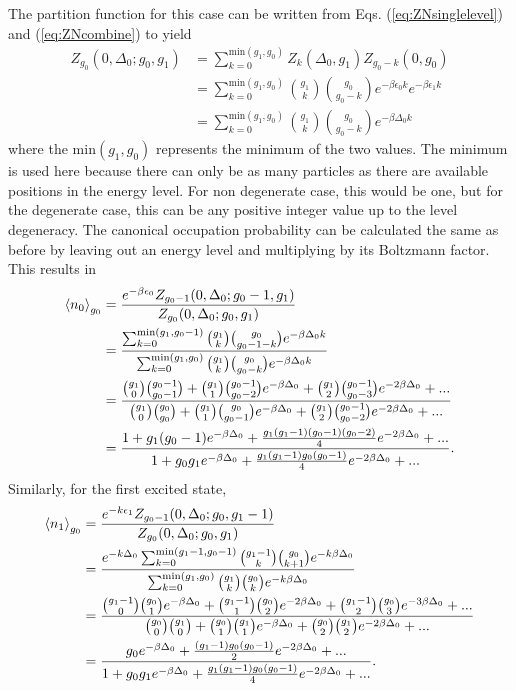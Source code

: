 The partition function for this case can be written from Eqs. (\ref{eq:ZNsinglelevel}) and (\ref{eq:ZNcombine}) to yield
\begin{align}
    Z_{g_0}(0,\Delta_0;g_0,g_1)&=\sum_{k=0}^{\text{min}(g_1,g_0)} Z_k(\Delta_0,g_1)Z_{g_0-k}(0,g_0)\nonumber\\
    &=\sum_{k=0}^{\text{min}(g_1,g_0)} {g_1 \choose k}{g_0\choose g_0-k} e^{-\beta \epsilon_0 k}e^{-\beta \epsilon_1 k}\nonumber\\
    &=\sum_{k=0}^{\text{min}(g_1,g_0)} {g_1 \choose k}{g_0\choose g_0-k} e^{-\beta \Delta_0 k}
\end{align}
where the $\text{min}(g_1,g_0)$ represents the minimum of the two values. The minimum is used here because there can only be as many particles as there are available positions in the energy level. For non degenerate case, this would be one, but for the degenerate case, this can be any positive integer value up to the level degeneracy. The canonical occupation probability can be calculated the same as before by leaving out an energy level and multiplying by its Boltzmann factor. This results in 
\begin{align}
    \left<{n_0}\right>_{g_0}&=\frac{e^{-\beta \epsilon_0}Z_{g_0-1}(0,\Delta_0;g_0-1,g_1)}{Z_{g_0}(0,\Delta_0;g_0,g_1)}\nonumber\\
    &=\frac{\sum_{k=0}^{\text{min}(g_1,g_0-1)} {g_1 \choose k}{g_0\choose g_0-1-k} e^{-\beta \Delta_0 k}}{\sum_{k=0}^{\text{min}(g_1,g_0)} {g_1 \choose k}{g_0\choose g_0-k} e^{-\beta \Delta_0 k }}\nonumber\\
    &=\frac{{g_1\choose 0}{g_0-1\choose g_0-1}+{g_1 \choose 1}{g_0-1\choose g_0-2}e^{-\beta\Delta_0}+{g_1\choose 2}{g_0-1\choose g_0-3}e^{-2\beta\Delta_0}+...}{{g_1\choose 0}{g_0\choose g_0}+{g_1 \choose 1}{g_0\choose g_0-1}e^{-\beta\Delta_0}+{g_1\choose 2}{g_0-1\choose g_0-2}e^{-2\beta\Delta_0}+...}\nonumber\\
    &=\frac{1+g_1(g_0-1)e^{-\beta\Delta_0}+\frac{g_1(g_1-1)(g_0-1)(g_0-2)}{4}e^{-2\beta\Delta_0}+...}{1+g_0g_1e^{-\beta\Delta_0}+\frac{g_1(g_1-1)g_0(g_0-1)}{4}e^{-2\beta\Delta_0}+...}. \label{2.20}
\end{align}
Similarly, for the first excited state,
\begin{align}
    \left<{n_1}\right>_{g_0}&=\frac{e^{-k\epsilon_1} Z_{g_0-1}(0,\Delta_0;g_0,g_1-1)}{Z_{g_0}(0,\Delta_0;g_0,g_1)}\nonumber\\
    &=\frac{e^{-k\Delta_0}\sum_{k=0}^{\text{min}(g_1-1,g_0-1)} {g_1-1\choose k}{g_0 \choose k+1} e^{-k\beta\Delta_0}}{\sum_{k=0}^{\text{min}(g_1,g_0)} {g_1\choose k}{g_0 \choose k} e^{-k\beta\Delta_0}}\nonumber\\
    &=\frac{{g_1-1\choose 0}{g_0\choose 1} e^{-\beta\Delta_0} +{g_1-1\choose 1}{g_0\choose 2} e^{-2\beta\Delta_0}+{g_1-1\choose 2}{g_0\choose 3}e^{-3\beta\Delta_0}+...}{{g_0\choose 0}{g_1\choose 0}+{g_0\choose 1}{g_1\choose 1}e^{-\beta\Delta_0}+{g_0\choose 2}{g_1\choose 2}e^{-2\beta\Delta_0}+...}\nonumber\\
    &=\frac{g_0e^{-\beta\Delta_0}+\frac{(g_1-1)g_0(g_0-1)}{2}e^{-2\beta\Delta_0}+...}{1+g_0g_1 e^{-\beta\Delta_0}+\frac{g_1(g_1-1)g_0(g_0-1)}{4}e^{-2\beta\Delta_0}+...}.
\end{align} 

